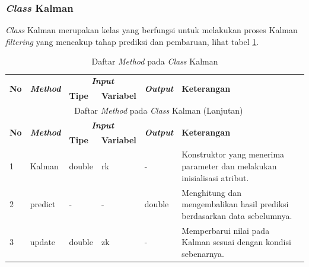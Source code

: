\subsubsection{\textit{Class} Kalman}
\noindent \textit{Class} Kalman merupakan kelas yang berfungsi untuk melakukan proses Kalman \textit{filtering} yang mencakup tahap prediksi dan pembaruan, lihat tabel \ref{tbl:classKalman}.
\begingroup
\setlength{\LTleft}{-20cm plus -1fill}
\setlength{\LTright}{\LTleft}
\begin{small}
\begin{longtable}{|p{0.4cm}|p{2cm}|p{1.8cm}|p{1.8cm}|p{1.7cm}|p{3.55cm}|}
	\caption{Daftar \textit{Method} pada \textit{Class} Kalman \label{tbl:classKalman}}\\
	\hline
	\multirow{2}{*}{\textbf{No}} & \multirow{2}{*}{\textit{\textbf{Method}}} & \multicolumn{2}{c|}{\textit{\textbf{Input}}} & \multirow{2}{*}{\textit{\textbf{Output}}} & 
	\multirow{2}{*}{\textbf{Keterangan}}\\
	\cline{3-4}
	& & \textbf{Tipe} & \textbf{Variabel} & & \\
	\endfirsthead
	\multicolumn{6}{c}{\textbf{\tablename~\thetable} Daftar \textit{Method} pada \textit{Class} Kalman (Lanjutan)} \\
	\hline
	\multirow{2}{*}{\textbf{No}} & \multirow{2}{*}{\textit{\textbf{Method}}} & \multicolumn{2}{c|}{\textit{\textbf{Input}}} & \multirow{2}{*}{\textit{\textbf{Output}}} & 
	\multirow{2}{*}{\textbf{Keterangan}}\\
	\cline{3-4}
	& & \textbf{Tipe} & \textbf{Variabel} & & \\
	\endhead
	\hline
	1 & Kalman & double & rk & - & Konstruktor yang menerima parameter dan melakukan inisialisasi atribut.\\
	\hline
	2 & predict & - & - & double & Menghitung dan mengembalikan hasil prediksi berdasarkan data sebelumnya.\\
	\hline
	3 & update & double & zk & - & Memperbarui nilai pada Kalman sesuai dengan kondisi sebenarnya.\\
	\hline
\end{longtable}
\end{small}
\endgroup


